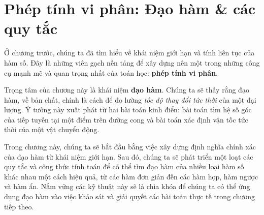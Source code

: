 \chapter{Phép tính vi phân: Đạo hàm \& các quy tắc}

Ở chương trước, chúng ta đã tìm hiểu về khái niệm giới hạn và tính liên tục của hàm số. Đây là những viên gạch nền tảng để xây dựng nên một trong những công cụ mạnh mẽ và quan trọng nhất của toán học: \textbf{phép tính vi phân}.

Trọng tâm của chương này là khái niệm \textbf{đạo hàm}. Chúng ta sẽ thấy rằng đạo hàm, về bản chất, chính là cách để đo lường \textit{tốc độ thay đổi tức thời} của một đại lượng. Ý tưởng này xuất phát từ hai bài toán kinh điển: bài toán tìm hệ số góc của tiếp tuyến tại một điểm trên đường cong và bài toán xác định vận tốc tức thời của một vật chuyển động.

Trong chương này, chúng ta sẽ bắt đầu bằng việc xây dựng định nghĩa chính xác của đạo hàm từ khái niệm giới hạn. Sau đó, chúng ta sẽ phát triển một loạt các quy tắc và công thức tính toán để có thể tìm đạo hàm của nhiều loại hàm số khác nhau một cách hiệu quả, từ các hàm đơn giản đến các hàm hợp, hàm ngược và hàm ẩn. Nắm vững các kỹ thuật này sẽ là chìa khóa để chúng ta có thể ứng dụng đạo hàm vào việc khảo sát và giải quyết các bài toán thực tế trong chương tiếp theo.


